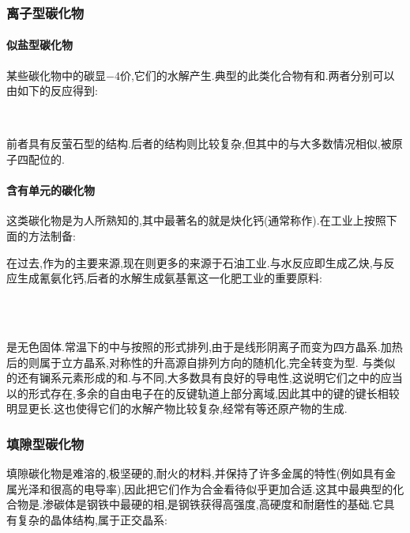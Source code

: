 \documentclass{ctexart}
\begin{document}
\subsubsection{离子型碳化物}
\paragraph{似盐型碳化物}
某些碳化物中的碳显$-4$价,它们的水解产生.典型的此类化合物有和.两者分别可以由如下的反应得到:
\begin{center}
    \\
\end{center}
前者具有反萤石型的结构.后者的结构则比较复杂,但其中的与大多数情况相似,被原子四配位的.
\paragraph{含有单元的碳化物}
这类碳化物是为人所熟知的,其中最著名的就是炔化钙(通常称作).在工业上按照下面的方法制备:
\begin{center}
\end{center}
在过去,作为的主要来源,现在则更多的来源于石油工业.与水反应即生成乙炔,与反应生成氰氨化钙,后者的水解生成氨基氰这一化肥工业的重要原料:
\begin{center}
    \\
    \\
\end{center}
是无色固体.常温下的中与按照的形式排列,由于是线形阴离子而变为四方晶系.加热后的则属于立方晶系,对称性的升高源自排列方向的随机化,完全转变为型.
与类似的还有镧系元素形成的和.与不同,大多数具有良好的导电性,这说明它们之中的应当以的形式存在,多余的自由电子在的反键轨道上部分离域,因此其中的键的键长相较明显更长.这也使得它们的水解产物比较复杂,经常有等还原产物的生成.
\subsubsection{填隙型碳化物}
填隙碳化物是难溶的,极坚硬的,耐火的材料,并保持了许多金属的特性(例如具有金属光泽和很高的电导率),因此把它们作为合金看待似乎更加合适.这其中最典型的化合物是.渗碳体是钢铁中最硬的相,是钢铁获得高强度,高硬度和耐磨性的基础.它具有复杂的晶体结构,属于正交晶系:
\end{document}
